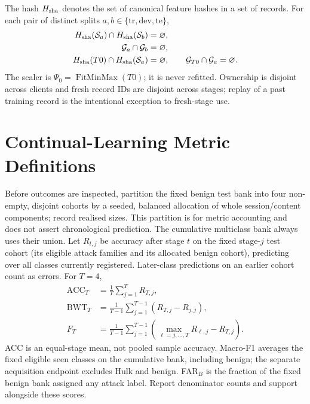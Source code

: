 \documentclass[10pt,a4paper]{article}
\begin{document}
The hash $H_{\rm sha}$ denotes the set of canonical feature hashes in a set of records. For each pair of distinct splits $a,b\in\{\mathrm{tr},\mathrm{dev},\mathrm{te}\}$,
\begin{equation}
\begin{aligned}
H_{\rm sha}(\mathcal S_a)\cap H_{\rm sha}(\mathcal S_b)&=\varnothing,\\
\mathcal G_a\cap\mathcal G_b&=\varnothing,\\
H_{\rm sha}(T0)\cap H_{\rm sha}(\mathcal S_a)&=\varnothing,\qquad
\mathcal G_{T0}\cap\mathcal G_a=\varnothing.
\end{aligned}
\label{eq:isolation}
\end{equation}
The scaler is $\Psi_0=\operatorname{FitMinMax}(T0)$; it is never refitted. Ownership is disjoint across clients and fresh record IDs are disjoint across stages; replay of a past training record is the intentional exception to fresh-stage use.

\section{Continual-Learning Metric Definitions}
\label{app:metrics}
Before outcomes are inspected, partition the fixed benign test bank into four non-empty, disjoint cohorts by a seeded, balanced allocation of whole session/content components; record realised sizes. This partition is for metric accounting and does not assert chronological prediction. The cumulative multiclass bank always uses their union. Let $R_{t,j}$ be accuracy after stage $t$ on the fixed stage-$j$ test cohort (its eligible attack families and its allocated benign cohort), predicting over all classes currently registered. Later-class predictions on an earlier cohort count as errors. For $T=4$,
\begin{equation}
\begin{aligned}
\mathrm{ACC}_T&=\tfrac1T\sum_{j=1}^{T}R_{T,j},\\
\mathrm{BWT}_T&=\tfrac1{T-1}\sum_{j=1}^{T-1}(R_{T,j}-R_{j,j}),\\
F_T&=\tfrac1{T-1}\sum_{j=1}^{T-1}\left(\max_{\ell=j,\ldots,T}R_{\ell,j}-R_{T,j}\right).
\end{aligned}
\end{equation}
ACC is an equal-stage mean, not pooled sample accuracy. Macro-F1 averages the fixed eligible seen classes on the cumulative bank, including benign; the separate acquisition endpoint excludes Hulk and benign. FAR$_B$ is the fraction of the fixed benign bank assigned any attack label. Report denominator counts and support alongside these scores.
\end{document}

